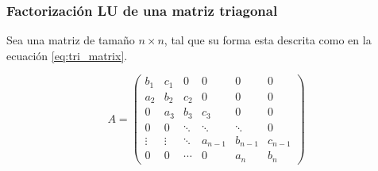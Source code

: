 \subsubsection{Factorización LU de una matriz triagonal\label{sec:LU_factorization}}

Sea una matriz de tamaño $n \times n$, tal que su forma esta descrita como en la ecuación \ref{eq:tri_matrix}\cite{el_2003}.

\begin{equation}
    A= \begin{pmatrix}
        b_1    & c_1    & 0      & 0       & 0       & 0       \\
        a_2    & b_2    & c_2    & 0       & 0       & 0       \\
        0      & a_3    & b_3    & c_3     & 0       & 0       \\
        0      & 0      & \ddots & \ddots  & \ddots  & 0       \\
        \vdots & \vdots & \ddots & a_{n-1} & b_{n-1} & c_{n-1} \\
        0      & 0      & \cdots & 0       & a_n     & b_n
    \end{pmatrix}
    \label{eq:tri_matrix}
\end{equation}

